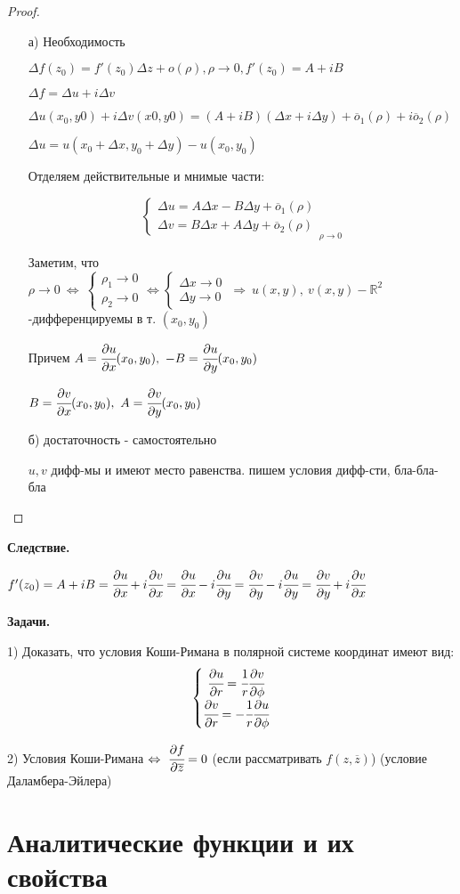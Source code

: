\documentclass[draft]{report}
\newcommand{\forcenewline}{$\phantom{\mbox{newline}}$}
\newcommand{\dd}{\partial}
\newcommand{\then}{\ \Rightarrow\ }
\newcommand{\R}{\mathbb{R}}
\newcommand{\LRA}{\Leftrightarrow}
\renewcommand{\bar}{\overline}
\renewcommand{\f}{\phi}
\newcommand{\D}{\Delta}
\newcommand{\z}{\bar{z}}
\renewcommand{\o}{\bar{o}}
\newcommand{\sys}[1]{\left\{\begin{matrix}#1\end{matrix}\right.}
\theoremstyle{remark}
\begin{document}
\begin{proof}
\forcenewline
\begin{itemize}
\item[а)] Необходимость

$\D f(z_0)=f'(z_0)\D z+o(\rho), \rho \to 0, f'(z_0)=A+iB$

$\D f=\D u+i\D v$

$\D u(x_0,y0)+i\D v(x0,y0)=(A+iB)(\D x+i\D y)+\o_1(\rho)+i\o_2(\rho)$

$\D u=u(x_0+\D x,y_0+\D y)-u(x_0,y_0)$

Отделяем действительные и мнимые части:

$$\sys{\D u=A\D x-B\D y+\o_1(\rho) \\ \D v=B\D x+A\D y+\o_2(\rho)}_{\rho\to 0}$$

Заметим, что $\rho\to 0\ \LRA\ \sys{\rho_1 \to 0 \\ \rho_2 \to 0} \LRA \sys{\D x\to 0 \\ \D y\to 0} \then u(x,y),\ v(x,y)-\R^2$-дифференцируемы в т. $(x_0,y_0)$

Причем $A=\cfrac{\dd u}{\dd x}(x_0,y_0),\ -B=\cfrac{\dd u}{\dd y}(x_0,y_0)$

$B=\cfrac{\dd v}{\dd x}(x_0,y_0),\ A=\cfrac{\dd v}{\dd y}(x_0,y_0)$

\item[б)] достаточность - самостоятельно

$u,v$ дифф-мы и имеют место равенства. пишем условия дифф-сти, бла-бла-бла
\end{itemize}
\end{proof}
{\bfseries Следствие.}

$f'(z_0)=A+iB=\cfrac{\dd u}{\dd x}+i\cfrac{\dd v}{\dd x}=\cfrac{\dd u}{\dd x}-i\cfrac{\dd u}{\dd y}=\cfrac{\dd v}{\dd y}-i\cfrac{\dd u}{\dd y}=\cfrac{\dd v}{\dd y}+i\cfrac{\dd v}{\dd x}$

{\bfseries Задачи.}

1) Доказать, что условия Коши-Римана в полярной системе координат имеют вид:
$$\sys{\cfrac{\dd u}{\dd r}=\cfrac 1r\cfrac{\dd v}{\dd \f} \\ \cfrac{\dd v}{\dd r}=-\cfrac 1r\cfrac{\dd u}{\dd \f}}$$

2) Условия Коши-Римана $\LRA\ \cfrac{\dd f}{\dd \z}=0$ (если рассматривать $f(z,\z)$) (условие Даламбера-Эйлера)

\section{Аналитические функции и их свойства}
\end{document}
